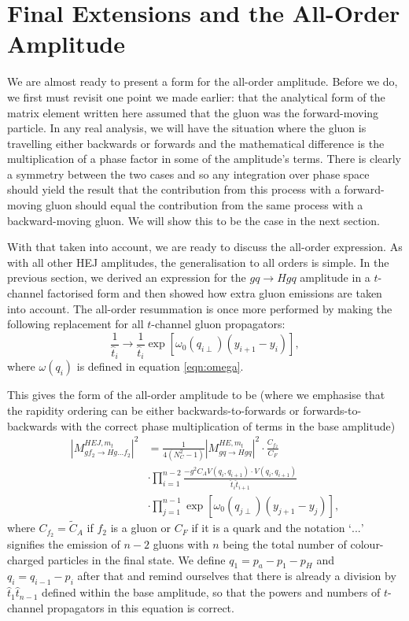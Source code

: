\clearpage

\section{Final Extensions and the All-Order Amplitude}
We are almost ready to present a form for the all-order amplitude. Before we do, we first must revisit one point we made earlier: that the analytical form of the matrix element written here assumed that the gluon was the forward-moving particle. In any real analysis, we will have the situation where the gluon is travelling either backwards or forwards and the mathematical difference is the multiplication of a phase factor in some of the amplitude's terms. There is clearly a symmetry between the two cases and so any integration over phase space should yield the result that the contribution from this process with a forward-moving gluon should equal the contribution from the same process with a backward-moving gluon. We will show this to be the case in the next section. 

With that taken into account, we are ready to discuss the all-order expression. As with all other HEJ amplitudes, the generalisation to all orders is simple. In the previous section, we derived an expression for the $gq \to Hgq$ amplitude in a $t$-channel factorised form and then showed how extra gluon emissions are taken into account. The all-order resummation is once more performed by making the following replacement for all $t$-channel gluon propagators:
\begin{equation}
\frac{1}{\hat{t}_i} \to \frac{1}{\hat{t}_i} \exp \left[ \omega_0(q_{i\perp})(y_{i+1} - y_i) \right],
\end{equation}
where $\omega(q_i)$ is defined in equation \ref{eqn:omega}. 

This gives the form of the all-order amplitude to be (where we emphasise that the rapidity ordering can be either backwards-to-forwards or forwards-to-backwards with the correct phase multiplication of terms in the base amplitude)
\begin{equation}
\begin{split}
|M_{gf_2 \to Hg...f_2}^{HEJ,m_t}|^2 &= \frac{1}{4(N_C^2-1)}|M_{gq \to Hgq}^{HE, m_t}|^2 \cdot \frac{C_{f_2}}{C_F} \\
&\cdot \prod_{i=1}^{n-2} \frac{-g^2 C_A V(q_{i}, q_{i+1}) \cdot V(q_{i}, q_{i+1})}{\hat{t}_{i} \hat{t}_{i+1}}  \\
& \cdot\prod_{j =1}^{n-1} \exp \left[ \omega_0(q_{j \perp})(y_{j+1} - y_j) \right],
\end{split}
\end{equation}
where $C_{f_2} = \tilde{C}_A$ if $f_2$ is a gluon or $C_F$ if it is a quark and the notation `$...$' signifies the emission of $n-2$ gluons with $n$ being the total number of colour-charged particles in the final state. We define $q_1 = p_a - p_1 -p_H$ and $q_i = q_{i-1} - p_i$ after that and remind ourselves that there is already a division by $\hat{t}_1 \hat{t}_{n-1}$ defined within the base amplitude, so that the powers and numbers of $t$-channel propagators in this equation is correct. 

